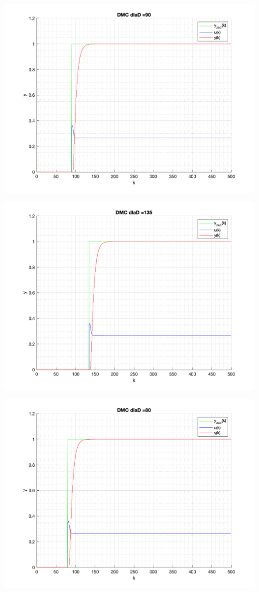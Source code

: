 \documentclass[a4paper, 11pt]{article}
\begin{document}
\begin{enumerate}
 \includegraphics[width=\linewidth]{./ModelsP4_D/P4_DMC_D_90_png.png} 
 
 \includegraphics[width=\linewidth]{./ModelsP4_D/P4_DMC_D_135_png.png} 
 
 \includegraphics[width=\linewidth]{./ModelsP4_D/P4_DMC_D_80_png.png} 
 

\end{enumerate}
\end{document}

